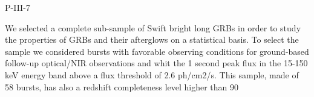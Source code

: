 P-III-7


\bigskip



\bigskip

\noindent We selected a complete sub-sample of Swift bright long GRBs in order to study the properties of GRBs and their afterglows on a statistical basis. To select the sample we considered bursts with favorable observing conditions for ground-based follow-up optical/NIR observations and whit the 1 second peak flux in the 15-150 keV energy band above a flux threshold of 2.6 ph/cm2/s. This sample, made of 58 bursts, has also a redshift completeness level higher than 90%

